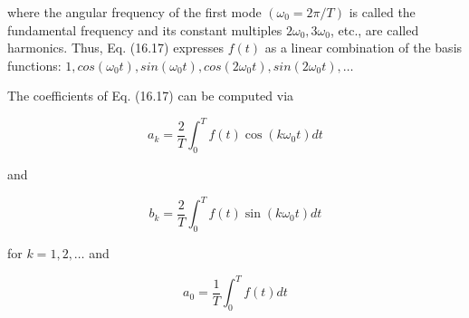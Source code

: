 \documentclass[../main.tex]{subfiles}
\begin{document}
\noindent where the angular frequency of the first mode $(\omega_0 = 2 \pi /T)$ is called the fundamental
frequency and its constant multiples $2 \omega_0, 3 \omega_0$, etc., are called harmonics. Thus, Eq. (16.17)
expresses $f(t)$ as a linear combination of the basis functions: $1, cos( \omega_0 t), sin(\omega_0 t), cos(2 \omega_0 t),
sin(2 \omega_0 t), \dots$

The coefficients of Eq. (16.17) can be computed via

\begin{equation}
	\tag{16.18}
	a_k = \frac{2}{T} \int ^ T _ 0 f(t) \cos (k \omega_0 t) dt
\end{equation}

\noindent and

\begin{equation}
	\tag{16.19}
	b_k = \frac{2}{T} \int ^ T _ 0 f(t) \sin (k \omega_0 t) dt
\end{equation}

\noindent for $k = 1, 2, \dots$ and

\begin{equation}
	\tag{16.20}
	a_0 = \frac{1}{T} \int ^ T _ 0 f(t)dt
\end{equation}
\end{document}
